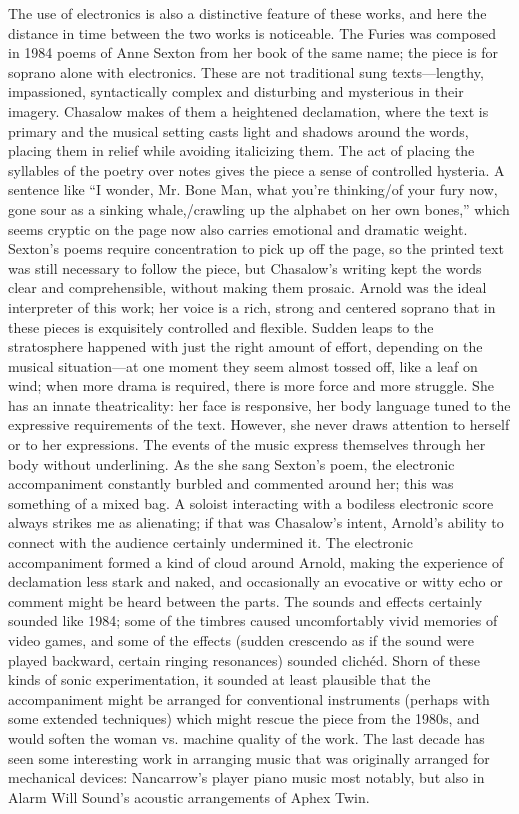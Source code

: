 The use of electronics is also a distinctive feature of these works, and here the distance in time between the two works is noticeable. The Furies was composed in 1984 poems of Anne Sexton from her book of the same name; the piece is for soprano alone with electronics. These are not traditional sung texts—lengthy, impassioned, syntactically complex and disturbing and mysterious in their imagery. Chasalow makes of them a heightened declamation, where the text is primary and the musical setting casts light and shadows around the words, placing them in relief while avoiding italicizing them. The act of placing the syllables of the poetry over notes gives the piece a sense of controlled hysteria. A sentence like “I wonder, Mr. Bone Man, what you’re thinking/of your fury now, gone sour as a sinking whale,/crawling up the alphabet on her own bones,” which seems cryptic on the page now also carries emotional and dramatic weight. Sexton’s poems require concentration to pick up off the page, so the printed text was still necessary to follow the piece, but Chasalow’s writing kept the words clear and comprehensible, without making them prosaic. Arnold was the ideal interpreter of this work; her voice is a rich, strong and centered soprano that in these pieces is exquisitely controlled and flexible. Sudden leaps to the stratosphere happened with just the right amount of effort, depending on the musical situation—at one moment they seem almost tossed off, like a leaf on wind; when more drama is required, there is more force and more struggle. She has an innate theatricality: her face is responsive, her body language tuned to the expressive requirements of the text. However, she never draws attention to herself or to her expressions. The events of the music express themselves through her body without underlining. As the she sang Sexton’s poem, the electronic accompaniment constantly burbled and commented around her; this was something of a mixed bag. A soloist interacting with a bodiless electronic score always strikes me as alienating; if that was Chasalow’s intent, Arnold’s ability to connect with the audience certainly undermined it. The electronic accompaniment formed a kind of cloud around Arnold, making the experience of declamation less stark and naked, and occasionally an evocative or witty echo or comment might be heard between the parts. The sounds and effects certainly sounded like 1984; some of the timbres caused uncomfortably vivid memories of video games, and some of the effects (sudden crescendo as if the sound were played backward, certain ringing resonances) sounded clichéd. Shorn of these kinds of sonic experimentation, it sounded at least plausible that the accompaniment might be arranged for conventional instruments (perhaps with some extended techniques) which might rescue the piece from the 1980s, and would soften the woman vs. machine quality of the work. The last decade has seen some interesting work in arranging music that was originally arranged for mechanical devices: Nancarrow’s player piano music most notably, but also in Alarm Will Sound’s acoustic arrangements of Aphex Twin.

